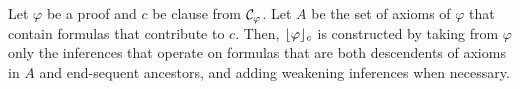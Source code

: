 \documentclass{llncs}
\begin{document}


\begin{definition} %
\label{definition:OProjection}
Let $\varphi$ be a proof and $c$ be clause from $\mathcal{C}_{\varphi}$. Let $A$ be the set of axioms of $\varphi$ that contain formulas that contribute to $c$. Then, $\lfloor \varphi \rfloor_{c}$ is constructed by taking from $\varphi$ only the inferences that operate on formulas that are both descendents of axioms in $A$ and end-sequent ancestors, and adding weakening inferences when necessary.
\end{definition}
\end{document}
